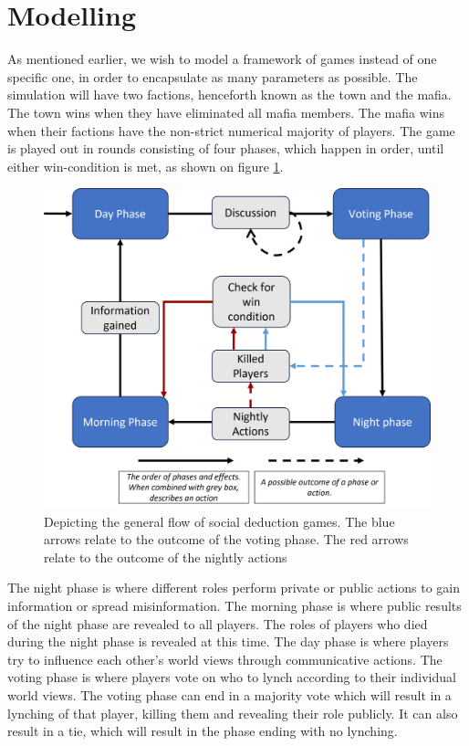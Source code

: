 \section{Modelling}
As mentioned earlier, we wish to model a framework of games instead of one
specific one, in order to encapsulate as many parameters as possible. The
simulation will have two factions, henceforth known as the town and the mafia.
The town wins when they have eliminated all mafia members. The mafia wins when
their factions have the non-strict numerical majority of players. The game is
played out in rounds consisting of four phases, which happen in order, until
either win-condition is met, as shown on figure \ref{fig:GameOverview}.
\begin{figure}[H]
	\includegraphics[width=1\linewidth]{figures/Game_overview3}
	\caption{Depicting the general flow of social deduction games. The blue arrows relate to the outcome of the voting phase. The red arrows relate to the outcome of the nightly actions}
	\label{fig:GameOverview}
\end{figure}

The night phase is where different roles perform private or public actions to
gain information or spread misinformation. The morning phase is where public
results of the night phase are revealed to all players. The roles of players
who died during the night phase is revealed at this time. The day phase is
where players try to influence each other's world views through communicative
actions. The voting phase is where players vote on who to lynch according to
their individual world views. The voting phase can end in a majority vote which
will result in a lynching of that player, killing them and revealing their role
publicly. It can also result in a tie, which will result in the phase ending
with no lynching.

